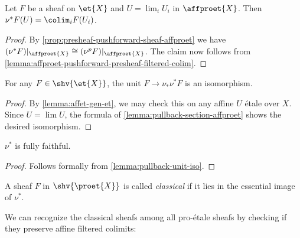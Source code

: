\begin{corollary}
    Let $F$ be a sheaf on $\et{X}$ and $U = \lim_i U_i$ in $\affproet{X}$. Then
    $\nu^*F(U) = \colim_i F(U_i)$.
    \label{lemma:pullback-section-affproet}
\end{corollary}

\begin{proof}
    By \ref{prop:presheaf-pushforward-sheaf-affproet} we have
    $(\nu^*F)|_{\affproet{X}} \cong (\nu^p F)|_{\affproet{X}}$. The claim now follows
    from \ref{lemma:affproet-pushforward-presheaf-filtered-colim}.
\end{proof}

\begin{corollary}
    For any $F \in \shv{\et{X}}$, the unit $F \to \nu_{*} \nu^{*} F$ is an isomorphism.
    \label{lemma:pullback-unit-iso}
    \leanok
\end{corollary}

\begin{proof}
    \leanok
    By \ref{lemma:affet-gen-et}, we may check this on any affine $U$ étale over $X$. Since
    $U = \lim U$, the formula of \ref{lemma:pullback-section-affproet} shows the desired isomorphism.
\end{proof}

\begin{corollary}
    $\nu^*$ is fully faithful.
    \label{lemma:pullback-fully-faithful}
    \leanok
\end{corollary}

\begin{proof}
    \leanok
    Follows formally from \ref{lemma:pullback-unit-iso}.
\end{proof}

\begin{definition}
    A sheaf $F$ in $\shv{\proet{X}}$ is called \emph{classical} if it lies in the essential
    image of $\nu^{*}$.
    \label{def:classical-sheaf}
\end{definition}

We can recognize the classical sheafs among all pro-étale sheafs by checking
if they preserve affine filtered colimits:

